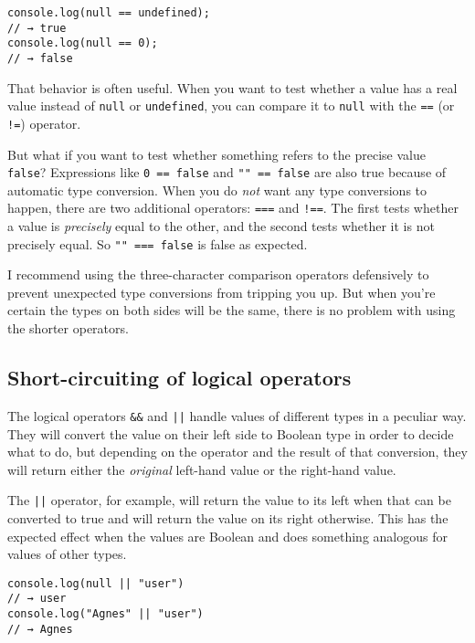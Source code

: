 \begin{lstlisting}
console.log(null == undefined);
// → true
console.log(null == 0);
// → false
\end{lstlisting}
\noindent

That behavior is often useful. When you want to test whether a value has a real value instead of \lstinline`null` or \lstinline`undefined`, you can compare it to \lstinline`null` with the \lstinline`==` (or \lstinline`!=`) operator.

But what if you want to test whether something refers to the precise value \lstinline`false`? Expressions like \lstinline`0 == false` and \lstinline`"" == false` are also true because of automatic type conversion. When you do \emph{not} want any type conversions to happen, there are two additional operators: \lstinline`===` and \lstinline`!==`. The first tests whether a value is \emph{precisely} equal to the other, and the second tests whether it is not precisely equal. So \lstinline`"" === false` is false as expected.

I recommend using the three-character comparison operators defensively to prevent unexpected type conversions from tripping you up. But when you're certain the types on both sides will be the same, there is no problem with using the shorter operators.

\subsection{Short-circuiting of logical operators}

The logical operators \lstinline`&&` and \lstinline`||` handle values of different types in a peculiar way. They will convert the value on their left side to Boolean type in order to decide what to do, but depending on the operator and the result of that conversion, they will return either the \emph{original} left-hand value or the right-hand value.

The \lstinline`||` operator, for example, will return the value to its left when that can be converted to true and will return the value on its right otherwise. This has the expected effect when the values are Boolean and does something analogous for values of other types.

\begin{lstlisting}
console.log(null || "user")
// → user
console.log("Agnes" || "user")
// → Agnes
\end{lstlisting}
\noindent{}

